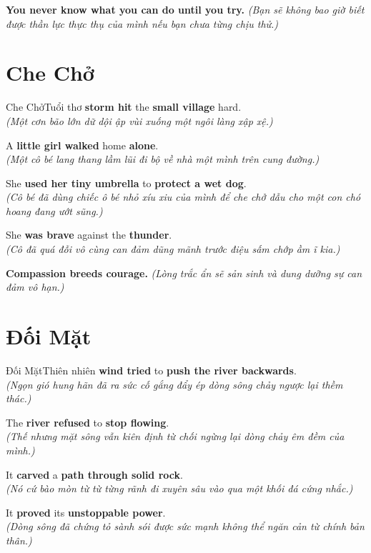 \begin{baihoc}
  \textbf{You never know what you can do until you try.} \textit{(Bạn sẽ không bao giờ biết được thần lực thực thụ của mình nếu bạn chưa từng chịu thử.)}
\end{baihoc}

\vspace{0.8cm}

\ngayDay{}
\section{Che Chở}
\begin{truyen}{Che Chở}{Tuổi thơ}
 \textbf{storm hit} the \textbf{small village} hard.\\
\textit{(Một cơn bão lớn dữ dội ập vùi xuống một ngôi làng xập xệ.)}

A \textbf{little girl walked} home \textbf{alone}.\\
\textit{(Một cô bé lang thang lầm lũi đi bộ về nhà một mình trên cung đường.)}

She \textbf{used her tiny umbrella} to \textbf{protect a wet dog}.\\
\textit{(Cô bé đã dùng chiếc ô bé nhỏ xíu xiu của mình để che chở dẫu cho một con chó hoang đang ướt sũng.)}

She \textbf{was brave} against the \textbf{thunder}.\\
\textit{(Cô đã quá đỗi vô cùng can đảm dũng mãnh trước điệu sấm chớp ầm ĩ kia.)}
\end{truyen}

\begin{baihoc}
  \textbf{Compassion breeds courage.} \textit{(Lòng trắc ẩn sẽ sản sinh và dung dưỡng sự can đảm vô hạn.)}
\end{baihoc}

\vspace{0.8cm}

\ngayDay{}
\section{Đối Mặt}
\begin{truyen}{Đối Mặt}{Thiên nhiên}
 \textbf{wind tried} to \textbf{push the river backwards}.\\
\textit{(Ngọn gió hung hãn đã ra sức cố gắng đẩy ép dòng sông chảy ngược lại thềm thác.)}

The \textbf{river refused} to \textbf{stop flowing}.\\
\textit{(Thế nhưng mặt sông vẫn kiên định từ chối ngừng lại dòng chảy êm đềm của mình.)}

It \textbf{carved} a \textbf{path through solid rock}.\\
\textit{(Nó cứ bào mòn từ từ từng rãnh đi xuyên sâu vào qua một khối đá cứng nhắc.)}

It \textbf{proved} its \textbf{unstoppable power}.\\
\textit{(Dòng sông đã chứng tỏ sành sói được sức mạnh không thể ngăn cản từ chính bản thân.)}
\end{truyen}

